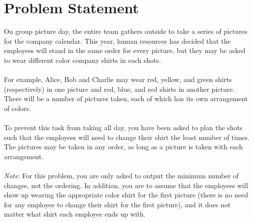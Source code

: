 \documentclass[11pt]{article}
\begin{document}
\pagestyle{fancy}


\section{Problem Statement}
On group picture day, the entire team gathers outside to take a series of
pictures for the company calendar. This year, human resources has decided
that the employees will stand in the same order for every picture, but they
may be asked to wear different color company shirts in each shots.
\\\\
For example, Alice, Bob and Charlie may wear red, yellow, and green shirts
(respectively) in one picture and red, blue, and red shirts in another picture.
There will be a number of pictures taken, each of which has its own arrangement
of colors.
\\\\
To prevent this task from taking all day, you have been asked to plan the shots
such that the employees will need to change their shirt the least number of times.
The pictures may be taken in any order, as long as a picture is taken with each arrangement.
\\\\
\emph{Note}: For this problem, you are only asked to output the minimum number of changes,
not the ordering. In addition, you are to assume that the employees will show up wearing
the appropriate color shirt for the first picture (there is no need for any employee to change
their shirt for the first picture), and it does not matter what shirt each employee ends up with.
\end{document}
